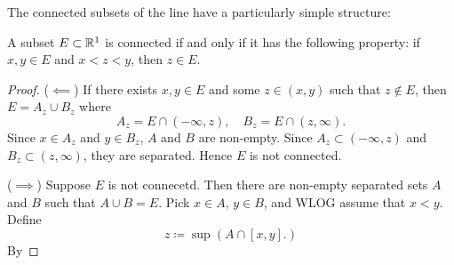 The connected subsets of the line have a particularly simple structure: 

\begin{proposition}
A subset $E\subset\mathbb R^1$ is connected if and only if it has the following property: if $x,y\in E$ and $x<z<y$, then $z\in E$.
\end{proposition}

\begin{proof}
($\impliedby$) If there exists $x,y\in E$ and some $z\in(x,y)$ such that $z\notin E$, then $E=A_z\cup B_z$ where
\[ A_z=E\cap(-\infty,z), \quad B_z=E\cap(z,\infty). \]
Since $x\in A_z$ and $y\in B_z$, $A$ and $B$ are non-empty. Since $A_z\subset(-\infty,z)$ and $B_z\subset(z,\infty)$, they are separated. Hence $E$ is not connected.

($\implies$) Suppose $E$ is not connecetd. Then there are non-empty separated sets $A$ and $B$ such that $A\cup B=E$. Pick $x\in A$, $y\in B$, and WLOG assume that $x<y$. Define
\[z\coloneqq\sup(A\cap[x,y].)\]
By 
\end{proof}